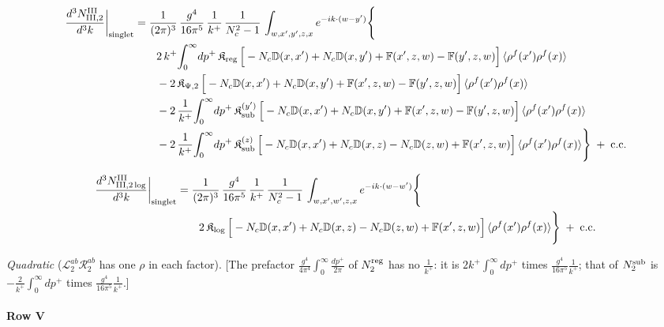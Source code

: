 \documentclass[10pt]{article}
\def\mf#1{\mathbb{#1}}
\begin{document}
\begin{align}
\frac{d^{3}N^{\rm III}_{{\rm III},2}}{d^{3}k}\bigg|_{\rm singlet}&=\frac{1}{(2\pi)^{3}}\,\frac{g^{4}}{16\pi^{5}}\,\frac{1}{k^{+}}\,\frac{1}{N_{c}^{2}-1}\,\int_{w,x',y',z,x}e^{-ik\cdot(w-y')}\Bigg\{\notag\\
&\qquad 2\,k^{+}\!\int_{0}^{\infty}\!dp^{+}\,\mathfrak{K}_{\rm reg}\,\Big[-N_{c}\mf{D}(x,x')+N_{c}\mf{D}(x,y')+\mf{F}(x',z,w)-\mf{F}(y',z,w)\Big]\,\langle\rho^{f}(x')\rho^{f}(x)\rangle\notag\\
&\qquad -2\,\mathfrak{K}_{\Psi,2}\,\Big[-N_{c}\mf{D}(x,x')+N_{c}\mf{D}(x,y')+\mf{F}(x',z,w)-\mf{F}(y',z,w)\Big]\,\langle\rho^{f}(x')\rho^{f}(x)\rangle\notag\\
&\qquad -2\,\frac{1}{k^{+}}\!\int_{0}^{\infty}\!dp^{+}\,\mathfrak{K}_{\rm sub}^{(y')}\,\Big[-N_{c}\mf{D}(x,x')+N_{c}\mf{D}(x,y')+\mf{F}(x',z,w)-\mf{F}(y',z,w)\Big]\,\langle\rho^{f}(x')\rho^{f}(x)\rangle\notag\\
&\qquad -2\,\frac{1}{k^{+}}\!\int_{0}^{\infty}\!dp^{+}\,\mathfrak{K}_{\rm sub}^{(z)}\,\Big[-N_{c}\mf{D}(x,x')+N_{c}\mf{D}(x,z)-N_{c}\mf{D}(z,w)+\mf{F}(x',z,w)\Big]\,\langle\rho^{f}(x')\rho^{f}(x)\rangle\Bigg\}\;+\;{\rm c.c.}\label{eq:s-III-III-2}
\end{align}

\begin{align}
\frac{d^{3}N^{\rm III}_{{\rm III},2\log}}{d^{3}k}\bigg|_{\rm singlet}&=\frac{1}{(2\pi)^{3}}\,\frac{g^{4}}{16\pi^{5}}\,\frac{1}{k^{+}}\,\frac{1}{N_{c}^{2}-1}\,\int_{w,x',w',z,x}e^{-ik\cdot(w-w')}\Bigg\{\notag\\
&\qquad 2\,\mathfrak{K}_{\log}\,\Big[-N_{c}\mf{D}(x,x')+N_{c}\mf{D}(x,z)-N_{c}\mf{D}(z,w)+\mf{F}(x',z,w)\Big]\,\langle\rho^{f}(x')\rho^{f}(x)\rangle\Bigg\}\;+\;{\rm c.c.}\label{eq:s-III-III-2log}
\end{align}

\emph{Quadratic} ($\mathcal{L}^{ab}_{2}\mathcal{R}^{ab}_{2}$ has one $\rho$ in each factor). [The prefactor $\frac{g^{4}}{4\pi^{4}}\int_{0}^{\infty}\frac{dp^{+}}{2\pi}$ of $N_{2}^{\rm reg}$ has no $\frac{1}{k^{+}}$: it is $2k^{+}\int_{0}^{\infty}dp^{+}$ times $\frac{g^{4}}{16\pi^{5}}\frac{1}{k^{+}}$; that of $N_{2}^{\rm sub}$ is $-\frac{2}{k^{+}}\int_{0}^{\infty}dp^{+}$ times $\frac{g^{4}}{16\pi^{5}}\frac{1}{k^{+}}$.]
\paragraph*{Row V}
\end{document}
